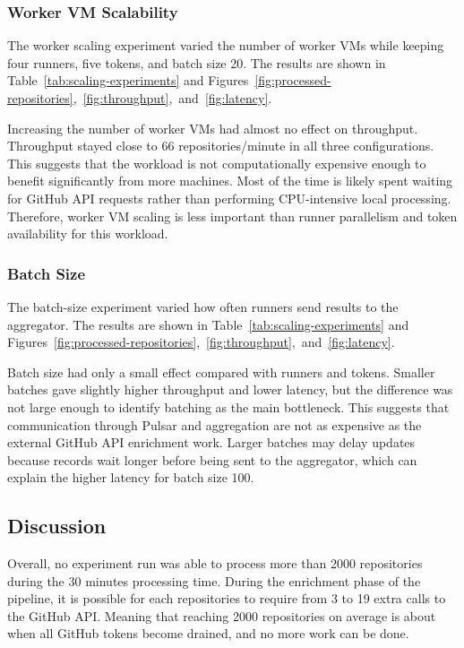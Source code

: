 \documentclass[conference]{IEEEtran}
\begin{document}
\subsubsection{Worker VM Scalability}

The worker scaling experiment varied the number of worker VMs while keeping four
runners, five tokens, and batch size 20. The results are shown in
Table~\ref{tab:scaling-experiments} and
Figures~\ref{fig:processed-repositories},~\ref{fig:throughput},~and~\ref{fig:latency}.

Increasing the number of worker VMs had almost no effect on throughput.
Throughput stayed close to 66 repositories/minute in all three configurations.
This suggests that the workload is not computationally expensive enough to
benefit significantly from more machines. Most of the time is likely spent
waiting for GitHub API requests rather than performing CPU-intensive local
processing. Therefore, worker VM scaling is less important than runner
parallelism and token availability for this workload.

\subsubsection{Batch Size}

The batch-size experiment varied how often runners send results to the
aggregator. The results are shown in Table~\ref{tab:scaling-experiments} and
Figures~\ref{fig:processed-repositories},~\ref{fig:throughput},~and~\ref{fig:latency}.

Batch size had only a small effect compared with runners and tokens. Smaller
batches gave slightly higher throughput and lower latency, but the difference
was not large enough to identify batching as the main bottleneck. This suggests
that communication through Pulsar and aggregation are not as expensive as the
external GitHub API enrichment work. Larger batches may delay updates because
records wait longer before being sent to the aggregator, which can explain the
higher latency for batch size 100.

\subsection{Discussion}

Overall, no experiment run was able to process more than 2000 repositories
during the 30 minutes processing time. During the enrichment phase of the
pipeline, it is possible for each repositories to require from 3 to 19 extra
calls to the GitHub API. Meaning that reaching 2000 repositories on average is
about when all GitHub tokens become drained, and no more work can be done.
\end{document}

